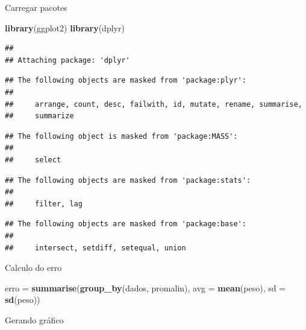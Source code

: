 \documentclass[
]{book}
\newenvironment{Shaded}{\begin{snugshade}}{\end{snugshade}}
\newcommand{\DataTypeTok}[1]{\textcolor[rgb]{0.13,0.29,0.53}{#1}}
\newcommand{\KeywordTok}[1]{\textcolor[rgb]{0.13,0.29,0.53}{\textbf{#1}}}
\newcommand{\NormalTok}[1]{#1}
\newcommand{\StringTok}[1]{\textcolor[rgb]{0.31,0.60,0.02}{#1}}
\begin{document}
Carregar pacotes

\begin{Shaded}
\begin{Highlighting}[]
\KeywordTok{library}\NormalTok{(ggplot2)}
\KeywordTok{library}\NormalTok{(dplyr)}
\end{Highlighting}
\end{Shaded}

\begin{verbatim}
## 
## Attaching package: 'dplyr'
\end{verbatim}

\begin{verbatim}
## The following objects are masked from 'package:plyr':
## 
##     arrange, count, desc, failwith, id, mutate, rename, summarise,
##     summarize
\end{verbatim}

\begin{verbatim}
## The following object is masked from 'package:MASS':
## 
##     select
\end{verbatim}

\begin{verbatim}
## The following objects are masked from 'package:stats':
## 
##     filter, lag
\end{verbatim}

\begin{verbatim}
## The following objects are masked from 'package:base':
## 
##     intersect, setdiff, setequal, union
\end{verbatim}

Calculo do erro

\begin{Shaded}
\begin{Highlighting}[]
\NormalTok{erro =}\StringTok{ }\KeywordTok{summarise}\NormalTok{(}\KeywordTok{group_by}\NormalTok{(dados, promalin), }
       \DataTypeTok{avg =} \KeywordTok{mean}\NormalTok{(peso), }\DataTypeTok{sd =} \KeywordTok{sd}\NormalTok{(peso))}
\end{Highlighting}
\end{Shaded}

Gerando gráfico
\end{document}
